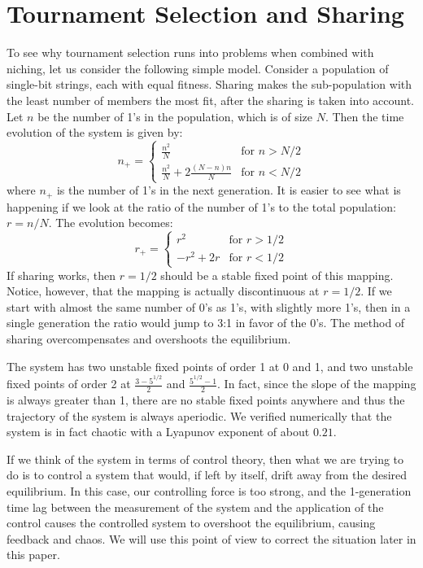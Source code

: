 \section{Tournament Selection and Sharing}
To see why tournament selection runs into problems when combined with niching,
let us consider the following simple model.  Consider a population of
single-bit strings, each with equal fitness.  Sharing makes the sub-population
with the least number of members the most fit, after the sharing is taken into
account.  Let $n$ be the number of 1's in the population, which is of size $N$.
Then the time evolution of the system is given by:
\begin{equation}
n_+=\left\{ \begin{array}{ll}
	\frac{n^2}{N} & \mbox{for $n>N/2$} \\
	\frac{n^2}{N} + 2 \frac{(N-n)n}{N} & \mbox{for $n<N/2$}
	\end{array}
\right. 
\end{equation}
where $n_+$ is the number of 1's in the next generation.  It is easier to
see what is happening if we look at the ratio of the number of 1's to the
total population: $r=n/N$.  The evolution becomes:
\begin{equation}
r_+=\left\{ \begin{array}{ll}
	r^2 & \mbox{for $r>1/2$}\\
	-r^2+2r & \mbox{for $r<1/2$}
	\end{array}
\right.
\end{equation}
If sharing works, then $r=1/2$ should be a stable fixed point of this mapping.
Notice, however, that the mapping is actually discontinuous at $r=1/2$.
If we start with almost the same number of 0's as 1's, with slightly more 1's,
then in a single generation the ratio would jump to 3:1 in favor of the 0's.
The method of sharing overcompensates and overshoots the equilibrium.

The system has two unstable fixed points of order 1 at 0 and 1, and two unstable
fixed points of order 2 at $\frac{3-5^{1/2}}{2}$ and $\frac{5^{1/2}-1}{2}$.
In fact, since the slope of the mapping is always greater than 1, there are
no stable fixed points anywhere and thus the trajectory of the system is
always aperiodic.  We verified numerically that the system is in fact chaotic
with a Lyapunov exponent of about $0.21$.

If we think of the system in terms of control theory, then what we are trying
to do is to control a system that would, if left by itself, drift away
from the desired equilibrium.  In this case, our controlling force is too
strong, and the 1-generation time lag between the measurement of the system
and the application of the control causes the controlled system to overshoot
the equilibrium, causing feedback and chaos.  We will use this point of view
to correct the situation later in this paper.

